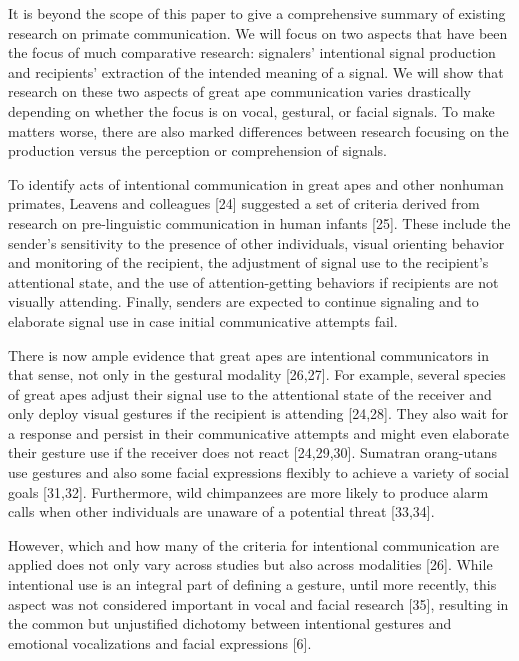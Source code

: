\documentclass[
  english,
  man,floatsintext]{apa6}
\begin{document}
It is beyond the scope of this paper to give a comprehensive summary of existing research on primate communication. We will focus on two aspects that have been the focus of much comparative research: signalers' intentional signal production and recipients' extraction of the intended meaning of a signal. We will show that research on these two aspects of great ape communication varies drastically depending on whether the focus is on vocal, gestural, or facial signals. To make matters worse, there are also marked differences between research focusing on the production versus the perception or comprehension of signals.

To identify acts of intentional communication in great apes and other nonhuman primates, Leavens and colleagues {[}24{]} suggested a set of criteria derived from research on pre-linguistic communication in human infants {[}25{]}. These include the sender's sensitivity to the presence of other individuals, visual orienting behavior and monitoring of the recipient, the adjustment of signal use to the recipient's attentional state, and the use of attention-getting behaviors if recipients are not visually attending. Finally, senders are expected to continue signaling and to elaborate signal use in case initial communicative attempts fail.

There is now ample evidence that great apes are intentional communicators in that sense, not only in the gestural modality {[}26,27{]}. For example, several species of great apes adjust their signal use to the attentional state of the receiver and only deploy visual gestures if the recipient is attending {[}24,28{]}. They also wait for a response and persist in their communicative attempts and might even elaborate their gesture use if the receiver does not react {[}24,29,30{]}. Sumatran orang-utans use gestures and also some facial expressions flexibly to achieve a variety of social goals {[}31,32{]}. Furthermore, wild chimpanzees are more likely to produce alarm calls when other individuals are unaware of a potential threat {[}33,34{]}.

However, which and how many of the criteria for intentional communication are applied does not only vary across studies but also across modalities {[}26{]}. While intentional use is an integral part of defining a gesture, until more recently, this aspect was not considered important in vocal and facial research {[}35{]}, resulting in the common but unjustified dichotomy between intentional gestures and emotional vocalizations and facial expressions {[}6{]}.
\end{document}
